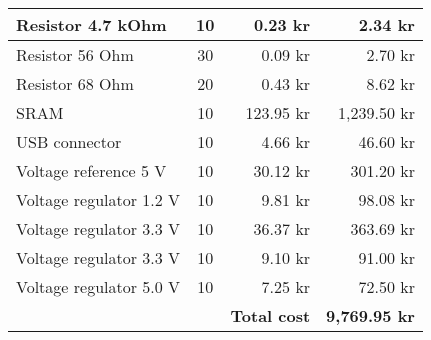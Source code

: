 \begin{longtable}{|l|c|r|r|}
    Resistor 4.7 kOhm       & 10     & 0.23 kr    & 2.34 kr     \\ \hline
    Resistor 56 Ohm         & 30     & 0.09 kr    & 2.70 kr     \\ \hline
    Resistor 68 Ohm         & 20     & 0.43 kr    & 8.62 kr     \\ \hline
    SRAM                    & 10     & 123.95 kr  & 1,239.50 kr \\ \hline
    USB connector           & 10     & 4.66 kr    & 46.60 kr    \\ \hline
    Voltage reference 5 V   & 10     & 30.12 kr   & 301.20 kr   \\ \hline
    Voltage regulator 1.2 V & 10     & 9.81 kr    & 98.08 kr    \\ \hline
    Voltage regulator 3.3 V & 10     & 36.37 kr   & 363.69 kr   \\ \hline
    Voltage regulator 3.3 V & 10     & 9.10 kr    & 91.00 kr    \\ \hline
    Voltage regulator 5.0 V & 10     & 7.25 kr    & 72.50 kr    \\ \hline \hline
    ~                       & ~      & \textbf{Total cost} & \textbf{9,769.95 kr} \\ \hline \hline
\end{longtable}
